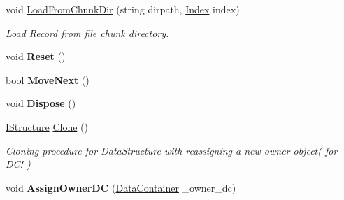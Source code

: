 \begin{DoxyCompactItemize}
void \hyperlink{class_dwarf_d_b_1_1_data_structures_1_1_record_a81ac5ba44d5682bfba61592af0195cd0}{LoadFromChunkDir} (string dirpath, \hyperlink{class_dwarf_d_b_1_1_data_structures_1_1_index}{Index} index)
\begin{DoxyCompactList}\small\item\em Load \hyperlink{class_dwarf_d_b_1_1_data_structures_1_1_record}{Record} from file chunk directory. \item\end{DoxyCompactList}\item 
\hypertarget{class_dwarf_d_b_1_1_data_structures_1_1_record_aefa85cab909d8d9b60aeabbb23bbc5c7}{
void {\bfseries Reset} ()}
\label{class_dwarf_d_b_1_1_data_structures_1_1_record_aefa85cab909d8d9b60aeabbb23bbc5c7}

\item 
\hypertarget{class_dwarf_d_b_1_1_data_structures_1_1_record_ad86f08f6a15fc5bef549031789a01ff8}{
bool {\bfseries MoveNext} ()}
\label{class_dwarf_d_b_1_1_data_structures_1_1_record_ad86f08f6a15fc5bef549031789a01ff8}

\item 
\hypertarget{class_dwarf_d_b_1_1_data_structures_1_1_record_a17055913d08d7d28c235547f248d4540}{
void {\bfseries Dispose} ()}
\label{class_dwarf_d_b_1_1_data_structures_1_1_record_a17055913d08d7d28c235547f248d4540}

\item 
\hyperlink{interface_dwarf_d_b_1_1_data_structures_1_1_i_structure}{IStructure} \hyperlink{class_dwarf_d_b_1_1_data_structures_1_1_record_a25e43ac7cdffc69c75cc466c859ce0ad}{Clone} ()
\begin{DoxyCompactList}\small\item\em Cloning procedure for DataStructure with reassigning a new owner object( for DC! ) \item\end{DoxyCompactList}\item 
\hypertarget{class_dwarf_d_b_1_1_data_structures_1_1_record_afccd7c4257b4a7953265490700ca5d84}{
void {\bfseries AssignOwnerDC} (\hyperlink{class_dwarf_d_b_1_1_data_structures_1_1_data_container}{DataContainer} \_\-owner\_\-dc)}
\label{class_dwarf_d_b_1_1_data_structures_1_1_record_afccd7c4257b4a7953265490700ca5d84}

\end{DoxyCompactItemize}
